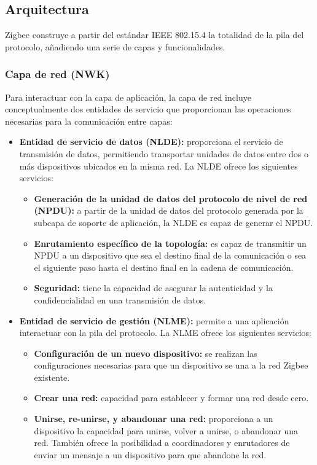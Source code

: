 \subsection{Arquitectura} %
Zigbee construye a partir del estándar IEEE 802.15.4 la totalidad de la pila del protocolo, añadiendo una serie de capas y funcionalidades.
\subsubsection{{\large Capa de red (NWK)}} %
Para interactuar con la capa de aplicación, la capa de red incluye conceptualmente dos entidades de servicio que proporcionan las operaciones necesarias para la comunicación entre capas:
\begin{itemize}
\item{\bf Entidad de servicio de datos (NLDE):}  proporciona el servicio de transmisión de datos, permitiendo transportar unidades de datos entre dos o más dispositivos ubicados en la misma red. La NLDE ofrece los siguientes servicios:
	\begin{itemize}
	\item{\bf Generación de la unidad de datos del protocolo de nivel de red (NPDU):} a partir de la unidad de datos del protocolo generada por la subcapa de soporte de aplicación, la NLDE es capaz de generar el NPDU.
	\item{\bf Enrutamiento específico de la topología:} es capaz de transmitir un NPDU a un dispositivo que sea el destino final de la comunicación o sea el siguiente paso hasta el destino final en la cadena de comunicación.
	\item{\bf Seguridad:} tiene la capacidad de asegurar la autenticidad y la confidencialidad en una transmisión de datos.
	\end{itemize}
\item{\bf Entidad de servicio de gestión (NLME):} permite a una aplicación interactuar con la pila del protocolo. La NLME ofrece los siguientes servicios:
	\begin{itemize}
	\item{\bf Configuración de un nuevo dispositivo:} se realizan las configuraciones necesarias para que un dispositivo se una a la red Zigbee existente.
	\item{\bf Crear una red:} capacidad para establecer y formar una red desde cero.
	\item{\bf Unirse, re-unirse, y abandonar una red:} proporciona a un dispositivo la capacidad para unirse, volver a unirse, o abandonar una red. También ofrece la posibilidad a coordinadores y enrutadores de enviar un mensaje a un dispositivo para que abandone la red.

\end{itemize}
\end{itemize}
